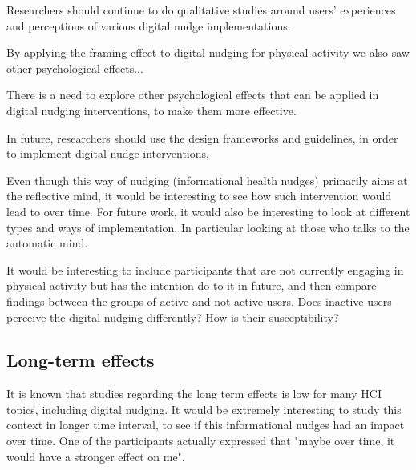 Researchers should continue to do qualitative studies around users' experiences and perceptions of various digital nudge implementations. 

By applying the framing effect to digital nudging for physical activity we also saw other psychological effects... 

There is a need to explore other psychological effects that can be applied in digital nudging interventions, to make them more effective.

In future, researchers should use the design frameworks and guidelines, in order to implement digital nudge interventions, 

Even though this way of nudging (informational health nudges) primarily aims at the reflective mind, it would be interesting to see how such intervention would lead to over time.  For future work, it would also be interesting to look at different types and ways of implementation. In particular looking at those who talks to the automatic mind. 


 It would be interesting to include participants that are not currently engaging in physical activity but has the intention do to it in future, and then compare findings between the groups of active and not active users. Does inactive users perceive the digital nudging differently? How is their susceptibility? 

\subsection{Long-term effects}
It is known that studies regarding the long term effects is low for many HCI topics, including digital nudging. It would be extremely interesting to study this context in longer time interval, to see if this informational nudges had an impact over time. One of the participants actually expressed that "maybe over time, it would have a stronger effect on me". 